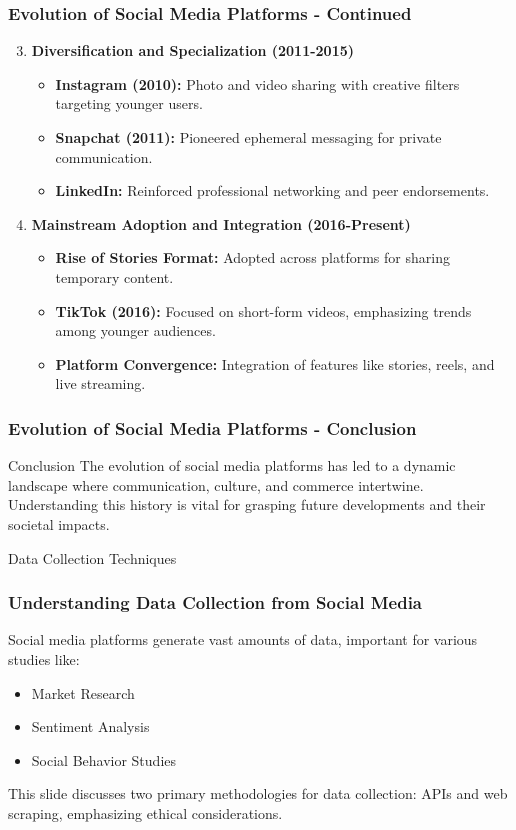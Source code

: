 \documentclass{beamer}
\begin{document}
\begin{frame}[fragile]
    \frametitle{Evolution of Social Media Platforms - Continued}
    \begin{enumerate}
        \setcounter{enumi}{2}
        \item \textbf{Diversification and Specialization (2011-2015)}
            \begin{itemize}
                \item \textbf{Instagram (2010):} Photo and video sharing with creative filters targeting younger users.
                \item \textbf{Snapchat (2011):} Pioneered ephemeral messaging for private communication.
                \item \textbf{LinkedIn:} Reinforced professional networking and peer endorsements.
            \end{itemize}
        \item \textbf{Mainstream Adoption and Integration (2016-Present)}
            \begin{itemize}
                \item \textbf{Rise of Stories Format:} Adopted across platforms for sharing temporary content.
                \item \textbf{TikTok (2016):} Focused on short-form videos, emphasizing trends among younger audiences.
                \item \textbf{Platform Convergence:} Integration of features like stories, reels, and live streaming.
            \end{itemize}
    \end{enumerate}
\end{frame}

\begin{frame}[fragile]
    \frametitle{Evolution of Social Media Platforms - Conclusion}
    \begin{block}{Conclusion}
        The evolution of social media platforms has led to a dynamic landscape where communication, culture, and commerce intertwine. Understanding this history is vital for grasping future developments and their societal impacts.
    \end{block}
\end{frame}

\begin{frame}{Data Collection Techniques}
    \frametitle{Understanding Data Collection from Social Media}
    Social media platforms generate vast amounts of data, important for various studies like:
    \begin{itemize}
        \item Market Research
        \item Sentiment Analysis
        \item Social Behavior Studies
    \end{itemize}
    This slide discusses two primary methodologies for data collection: APIs and web scraping, emphasizing ethical considerations.
\end{frame}
\end{document}
